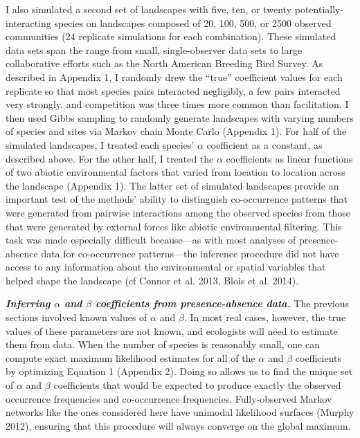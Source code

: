 \documentclass[12pt,]{article}
\begin{document}
\begin{spacing}{1.9}
\begin{flushleft}
I also simulated a second set of landscapes with five, ten, or twenty
potentially-interacting species on landscapes composed of 20, 100, 500,
or 2500 observed communities (24 replicate simulations for each
combination). These simulated data sets span the range from small,
single-observer data sets to large collaborative efforts such as the
North American Breeding Bird Survey. As described in Appendix 1, I
randomly drew the ``true'' coefficient values for each replicate so that
most species pairs interacted negligibly, a few pairs interacted very
strongly, and competition was three times more common than facilitation.
I then used Gibbs sampling to randomly generate landscapes with varying
numbers of species and sites via Markov chain Monte Carlo (Appendix 1).
For half of the simulated landscapes, I treated each species' \(\alpha\)
coefficient as a constant, as described above. For the other half, I
treated the \(\alpha\) coefficients as linear functions of two abiotic
environmental factors that varied from location to location across the
landscape (Appendix 1). The latter set of simulated landscapes provide
an important test of the methods' ability to distinguish co-occurrence
patterns that were generated from pairwise interactions among the
observed species from those that were generated by external forces like
abiotic environmental filtering. This task was made especially difficult
because---as with most analyses of presence-absence data for
co-occurrence patterns---the inference procedure did not have access to
any information about the environmental or spatial variables that helped
shape the landscape (cf Connor et al. 2013, Blois et al. 2014).

\textbf{\emph{Inferring \(\alpha\) and \(\beta\) coefficients from
presence-absence data.}} The previous sections involved known values of
\(\alpha\) and \(\beta\). In most real cases, however, the true values
of these parameters are not known, and ecologists will need to estimate
them from data. When the number of species is reasonably small, one can
compute exact maximum likelihood estimates for all of the \(\alpha\) and
\(\beta\) coefficients by optimizing Equation 1 (Appendix 2). Doing so
allows us to find the unique set of \(\alpha\) and \(\beta\)
coefficients that would be expected to produce exactly the observed
occurrence frequencies and co-occurrence frequencies. Fully-observed
Markov networks like the ones considered here have unimodal likelihood
surfaces (Murphy 2012), ensuring that this procedure will always
converge on the global maximum.


\end{flushleft}
\end{spacing}
\end{document}
